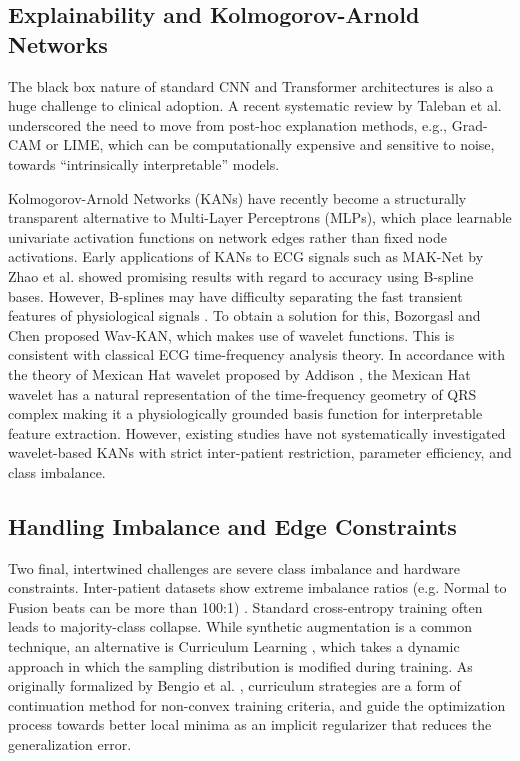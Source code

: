 \documentclass[journal,twoside,web]{ieeecolor}
\begin{document}
\subsection{Explainability and Kolmogorov-Arnold Networks}
The black box nature of standard CNN and Transformer architectures is also a huge challenge to clinical adoption. A recent systematic review by Taleban et al. \cite{taleban_explainable_2026} underscored the need to move from post-hoc explanation methods, e.g., Grad-CAM or LIME, which can be computationally expensive and sensitive to noise, towards ``intrinsically interpretable'' models. 

Kolmogorov-Arnold Networks (KANs) \cite{liu_kan_2024} have recently become a structurally transparent alternative to Multi-Layer Perceptrons (MLPs), which place learnable univariate activation functions on network edges rather than fixed node activations. Early applications of KANs to ECG signals such as MAK-Net by Zhao et al. \cite{zhao_mak-net_2025} showed promising results with regard to accuracy using B-spline bases. However, B-splines may have difficulty separating the fast transient features of physiological signals \cite{bozorgasl_liu_2024}. To obtain a solution for this, Bozorgasl and Chen \cite{bozorgasl_liu_2024} proposed Wav-KAN, which makes use of wavelet functions. This is consistent with classical ECG time-frequency analysis theory. In accordance with the theory of Mexican Hat wavelet proposed by Addison \cite{addison_wavelet_2005}, the Mexican Hat wavelet has a natural representation of the time-frequency geometry of QRS complex making it a physiologically grounded basis function for interpretable feature extraction. However, existing studies have not systematically investigated wavelet-based KANs with strict inter-patient restriction, parameter efficiency, and class imbalance.

\subsection{Handling Imbalance and Edge Constraints}
Two final, intertwined challenges are severe class imbalance and hardware constraints. Inter-patient datasets show extreme imbalance ratios (e.g. Normal to Fusion beats can be more than 100:1) \cite{silva_systematic_2025}. Standard cross-entropy training often leads to majority-class collapse. While synthetic augmentation is a common technique, an alternative is Curriculum Learning \cite{bengio_curriculum_2009}, which takes a dynamic approach in which the sampling distribution is modified during training. As originally formalized by Bengio et al. \cite{bengio_curriculum_2009}, curriculum strategies are a form of continuation method for non-convex training criteria, and guide the optimization process towards better local minima as an implicit regularizer that reduces the generalization error.
\end{document}
